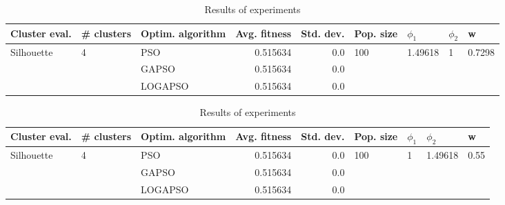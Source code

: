 \documentclass{article}
\begin{document}
\begin{table}
\centering
\caption{Results of experiments}
\begin{tabular}{lllrrllll}
\toprule
              Cluster eval. &        \# clusters & Optim. algorithm &  Avg. fitness &  Std. dev. &            Pop. size &               $\phi_{1}$ &         $\phi_{2}$ &                       w \\
\midrule
\multirow{3}{*}{Silhouette} & \multirow{3}{*}{4} &              PSO &      0.515634 &        0.0 & \multirow{3}{*}{100} & \multirow{3}{*}{1.49618} & \multirow{3}{*}{1} & \multirow{3}{*}{0.7298} \\
                            &                    &            GAPSO &      0.515634 &        0.0 &                      &                          &                    &                         \\
                            &                    &          LOGAPSO &      0.515634 &        0.0 &                      &                          &                    &                         \\
\bottomrule
\end{tabular}
\end{table}
\begin{table}
\centering
\caption{Results of experiments}
\begin{tabular}{lllrrllll}
\toprule
              Cluster eval. &        \# clusters & Optim. algorithm &  Avg. fitness &  Std. dev. &            Pop. size &         $\phi_{1}$ &               $\phi_{2}$ &                     w \\
\midrule
\multirow{3}{*}{Silhouette} & \multirow{3}{*}{4} &              PSO &      0.515634 &        0.0 & \multirow{3}{*}{100} & \multirow{3}{*}{1} & \multirow{3}{*}{1.49618} & \multirow{3}{*}{0.55} \\
                            &                    &            GAPSO &      0.515634 &        0.0 &                      &                    &                          &                       \\
                            &                    &          LOGAPSO &      0.515634 &        0.0 &                      &                    &                          &                       \\
\bottomrule
\end{tabular}
\end{table}
\end{document}
